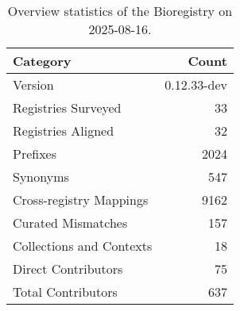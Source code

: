 \begin{table}
\caption{Overview statistics of the Bioregistry on 2025-08-16.}
\label{tab:bioregistry-summary}
\begin{tabular}{lr}
\toprule
Category & Count \\
\midrule
Version & 0.12.33-dev \\
Registries Surveyed & 33 \\
Registries Aligned & 32 \\
Prefixes & 2024 \\
Synonyms & 547 \\
Cross-registry Mappings & 9162 \\
Curated Mismatches & 157 \\
Collections and Contexts & 18 \\
Direct Contributors & 75 \\
Total Contributors & 637 \\
\bottomrule
\end{tabular}
\end{table}
